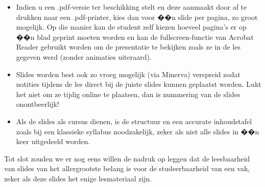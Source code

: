 \documentclass[a4paper,11pt,oneside]{article}
\newcommand{\npar}{\vspace{0.5cm} \par \noindent}      %
\begin{document}
\begin{itemize}
\item Indien u een .pdf-versie ter beschikking stelt en deze aanmaakt door af te drukken naar een .pdf-printer, kies dan voor ��n slide per pagina, zo groot mogelijk.  Op die manier kan de student zelf kiezen hoeveel pagina's er op ��n blad geprint moeten worden en kan de fullscreen-functie van Acrobat Reader gebruikt worden om de presentatie te bekijken zoals ze in de les gegeven werd (zonder animaties uiteraard).
\item Slides worden best ook zo vroeg mogelijk (via Minerva) verspreid zodat notities tijdens de les direct bij de juiste slides kunnen geplaatst worden. Lukt het niet om ze tijdig online te plaatsen, dan is nummering van de slides onontbeerlijk!
\item Als de slides als cursus dienen, is de structuur en een accurate inhoudstafel zoals bij een klassieke syllabus noodzakelijk, zeker 
als niet alle slides in ��n keer uitgedeeld worden. 

\end{itemize}
\npar Tot slot zouden we er nog eens willen de nadruk op leggen dat de leesbaarheid van slides van het allergrootste belang is voor de studeerbaarheid van een vak, zeker als deze slides het enige lesmateriaal zijn.
\end{document}
